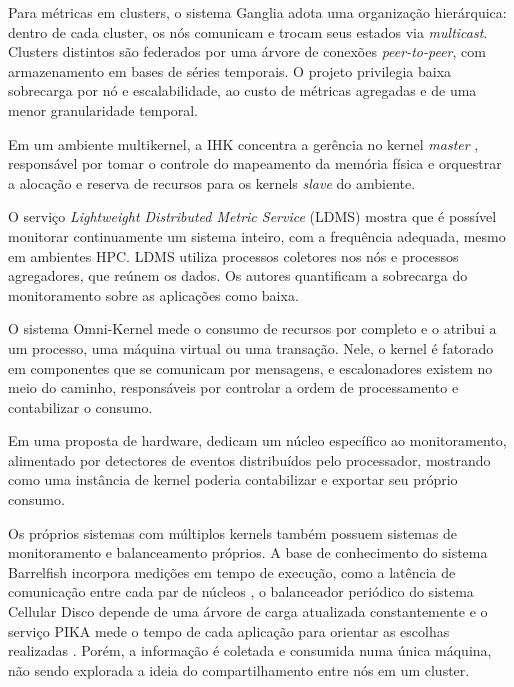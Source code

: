 Para métricas em clusters, o sistema Ganglia \citep{massie2004ganglia} adota uma organização hierárquica: dentro de cada cluster,
os nós comunicam e trocam seus estados via \textit{multicast}.
Clusters distintos são federados por uma árvore de conexões \textit{peer-to-peer}, com armazenamento em bases de séries temporais.
O projeto privilegia baixa sobrecarga por nó e escalabilidade, ao custo de métricas agregadas e de uma menor granularidade temporal.

Em um ambiente multikernel, a IHK concentra a gerência no kernel \textit{master} \citep{shimosawa2014ihk}, responsável por
tomar o controle do mapeamento da memória física e orquestrar a alocação e reserva de recursos para os kernels \textit{slave} do ambiente.

O serviço \textit{Lightweight Distributed Metric Service} (LDMS) \citep{agelastos2014ldms} mostra que é possível monitorar continuamente um sistema inteiro, com a frequência adequada, mesmo em ambientes HPC.
LDMS utiliza processos coletores nos nós e processos agregadores, que reúnem os dados.
Os autores quantificam a sobrecarga do monitoramento sobre as aplicações como baixa.

O sistema Omni-Kernel \citep{kvalnes2015omni} mede o consumo de recursos por completo e o atribui a um processo,
uma máquina virtual ou uma transação.
Nele, o kernel é fatorado em componentes que se comunicam por mensagens, e escalonadores existem no meio do caminho,
responsáveis por controlar a ordem de processamento e contabilizar o consumo.

Em uma proposta de hardware, \citet{west2009coremonitors} dedicam um núcleo específico ao monitoramento, alimentado por detectores de
eventos distribuídos pelo processador, mostrando como uma instância de kernel poderia contabilizar e exportar seu próprio consumo.

Os próprios sistemas com múltiplos kernels também possuem sistemas de monitoramento e balanceamento próprios.
A base de conhecimento do sistema Barrelfish incorpora medições em tempo de execução, como a latência de comunicação entre cada par de
núcleos \citep{baumann2009multikernel}, o balanceador periódico do sistema Cellular Disco
depende de uma árvore de carga atualizada constantemente \citep{govil2000cellular} e o serviço PIKA mede o tempo de cada
aplicação para orientar as escolhas realizadas \citep{beckmann2014pika}.
Porém, a informação é coletada e consumida numa única máquina, não sendo explorada a ideia do compartilhamento entre nós em um cluster.

